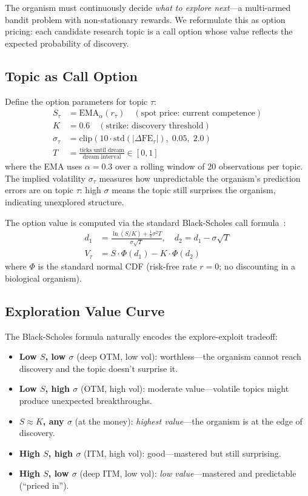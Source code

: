 \documentclass[11pt,a4paper,twocolumn]{article}
\begin{document}
The organism must continuously decide \emph{what to explore next}---a multi-armed bandit problem with non-stationary rewards.
We reformulate this as option pricing: each candidate research topic is a call option whose value reflects the expected probability of discovery.

\subsection{Topic as Call Option}

Define the option parameters for topic $\tau$:
\begin{align}
S_\tau &= \mathrm{EMA}_\alpha(r_\tau) \quad (\text{spot price: current competence}) \label{eq:bs_spot} \\
K &= 0.6 \quad (\text{strike: discovery threshold}) \label{eq:bs_strike} \\
\sigma_\tau &= \mathrm{clip}\!\left(10 \cdot \mathrm{std}(|\Delta\mathrm{FE}_\tau|),\; 0.05,\; 2.0\right) \label{eq:bs_sigma} \\
T &= \frac{\text{ticks until dream}}{\text{dream interval}} \in [0,1] \label{eq:bs_time}
\end{align}
where the EMA uses $\alpha = 0.3$ over a rolling window of 20 observations per topic.
The implied volatility $\sigma_\tau$ measures how unpredictable the organism's prediction errors are on topic $\tau$: high $\sigma$ means the topic still surprises the organism, indicating unexplored structure.

The option value is computed via the standard Black-Scholes call formula~\cite{black1973}:
\begin{align}
d_1 &= \frac{\ln(S/K) + \frac{1}{2}\sigma^2 T}{\sigma\sqrt{T}}, \quad d_2 = d_1 - \sigma\sqrt{T} \label{eq:bs_d1d2} \\
V_\tau &= S \cdot \Phi(d_1) - K \cdot \Phi(d_2) \label{eq:bs_call}
\end{align}
where $\Phi$ is the standard normal CDF (risk-free rate $r = 0$; no discounting in a biological organism).

\subsection{Exploration Value Curve}

The Black-Scholes formula naturally encodes the explore-exploit tradeoff:
\begin{itemize}
\item \textbf{Low $S$, low $\sigma$} (deep OTM, low vol): worthless---the organism cannot reach discovery and the topic doesn't surprise it.
\item \textbf{Low $S$, high $\sigma$} (OTM, high vol): moderate value---volatile topics might produce unexpected breakthroughs.
\item \textbf{$S \approx K$, any $\sigma$} (at the money): \emph{highest value}---the organism is at the edge of discovery.
\item \textbf{High $S$, high $\sigma$} (ITM, high vol): good---mastered but still surprising.
\item \textbf{High $S$, low $\sigma$} (deep ITM, low vol): \emph{low value}---mastered and predictable (``priced in'').
\end{itemize}
\end{document}
